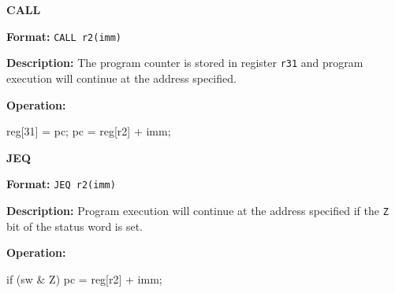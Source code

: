 \noindent\textsf{\textbf{\Large CALL}}\par
{}\par\begin{indented}{\bf Format:}
{\tt CALL r2(imm)}\par\vspace{3ex}
\end{indented}\vspace{4ex}
\begin{indented}{\bf Description:}
The program counter is stored in register {\tt r31} and program execution
will continue at the address specified.
\end{indented}
\begin{indented}{\bf Operation:}\vspace{.8ex}
\begin{verbatimtab}
reg[31] = pc;
pc = reg[r2] + imm;
\end{verbatimtab}
\end{indented}
\vspace{2em}

\newpage
\noindent\textsf{\textbf{\Large JEQ}}\par
{}\par\begin{indented}{\bf Format:}
{\tt JEQ r2(imm)}\par\vspace{3ex}
\end{indented}\vspace{4ex}
\begin{indented}{\bf Description:}
Program execution will continue at the address specified if the {\tt Z} bit
of the status word is set.
\end{indented}
\begin{indented}{\bf Operation:}\vspace{.8ex}
\begin{verbatimtab}
if (sw & Z) {
    pc = reg[r2] + imm;
}
\end{verbatimtab}
\end{indented}
\vspace{2em}


